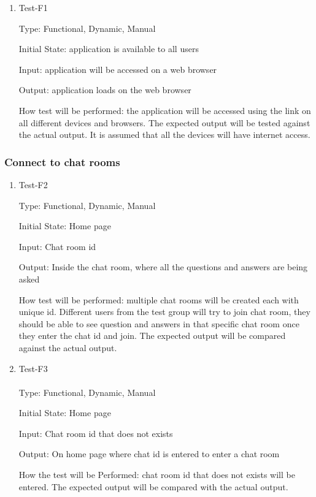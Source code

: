 \documentclass[12pt, titlepage]{article}
\begin{document}
\begin{enumerate}

\item{Test-F1\\}

Type: Functional, Dynamic, Manual
					
Initial State: application is available to all users
					
Input: application will be accessed on a web browser
					
Output: application loads on the web browser
					
How test will be performed: the application will be accessed using the link on all different devices and browsers. The expected output will be tested against the actual output. It is assumed that all the devices will have internet access. 
					
\end{enumerate}

\subsubsection{Connect to chat rooms}
		

\begin{enumerate}

\item{Test-F2\\}

Type: Functional, Dynamic, Manual
					
Initial State: Home page
					
Input: Chat room id
					
Output: Inside the chat room, where all the questions and answers are being asked 
					
How test will be performed: multiple chat rooms will be created each with unique id. Different users from the test group will try to join chat room, they should be able to see question and answers in that specific chat room once they enter the chat id and join. The expected output will be compared against the actual output.

\item{Test-F3\\\\}
Type: Functional, Dynamic, Manual

Initial State: Home page

Input: Chat room id that does not exists

Output: On home page where chat id is entered to enter a chat room 

How the test will be Performed: chat room id that does not exists will be entered. The expected output will be compared with the actual output. 

\end{enumerate}
\end{document}
